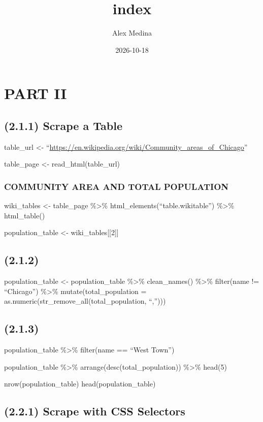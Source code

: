 \documentclass[
]{article}
\title{index}
\author{Alex Medina}
\date{2026-10-18}
\begin{document}
\maketitle

\section{PART II}\label{part-ii}

\subsection{(2.1.1) Scrape a Table}\label{scrape-a-table}

table\_url \textless-
``\url{https://en.wikipedia.org/wiki/Community_areas_of_Chicago}''

table\_page \textless- read\_html(table\_url)

\subsubsection{COMMUNITY AREA AND TOTAL
POPULATION}\label{community-area-and-total-population}

wiki\_tables \textless- table\_page \%\textgreater\%
html\_elements(``table.wikitable'') \%\textgreater\% html\_table()

population\_table \textless- wiki\_tables{[}{[}2{]}{]}

\subsection{(2.1.2)}\label{section}

population\_table \textless- population\_table \%\textgreater\%
clean\_names() \%\textgreater\% filter(name != ``Chicago'')
\%\textgreater\% mutate(total\_population =
as.numeric(str\_remove\_all(total\_population, ``,'')))

\subsection{(2.1.3)}\label{section-1}

population\_table \%\textgreater\% filter(name == ``West Town'')

population\_table \%\textgreater\% arrange(desc(total\_population))
\%\textgreater\% head(5)

nrow(population\_table) head(population\_table)

\subsection{(2.2.1) Scrape with CSS
Selectors}\label{scrape-with-css-selectors}
\end{document}
